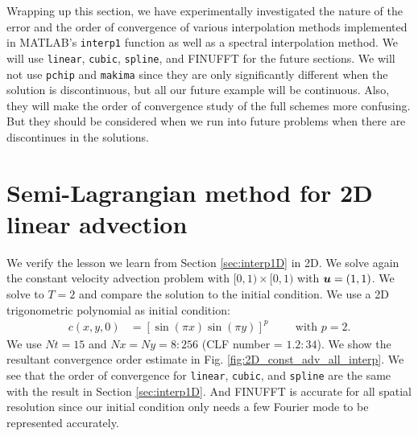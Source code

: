 \documentclass[11pt,letterpaper]{article}
\begin{document}
Wrapping up this section, we have experimentally investigated the nature of the error and the order of convergence of various interpolation methods implemented in MATLAB's \texttt{interp1} function as well as a spectral interpolation method. We will use \texttt{linear}, \texttt{cubic}, \texttt{spline}, and FINUFFT for the future sections. We will not use \texttt{pchip} and \texttt{makima} since they are only significantly different when the solution is discontinuous, but all our future example will be continuous. Also, they will make the order of convergence study of the full \sml\;schemes more confusing. But they should be considered when we run into future problems when there are discontinues in the solutions. 

\section{Semi-Lagrangian method for 2D linear advection}\label{sec:linear_adv}
We verify the lesson we learn from Section \ref{sec:interp1D} in 2D. We solve again the constant velocity advection problem with $[0,1)\times [0,1)$ with $\boldsymbol{u} = (1,1)$. We solve to $T = 2$ and compare the solution to the initial condition. We use a 2D trigonometric polynomial as initial condition:
\begin{align}
    c(x,y,0) &= [\sin(\pi x)\sin(\pi y)]^p \hspace{1cm}\text{with }p = 2.\label{eq:sinp2}
\end{align}
We use $Nt = 15$ and $Nx = Ny = 8:256$ (CLF number = $1.2:34$). We show the resultant convergence order estimate in Fig. \ref{fig:2D_const_adv_all_interp}. We see that the order of convergence for \texttt{linear}, \texttt{cubic}, and \texttt{spline} are the same with the result in Section \ref{sec:interp1D}. And FINUFFT is accurate for all spatial resolution since our initial condition only needs a few Fourier mode to be represented accurately. 
\end{document}

